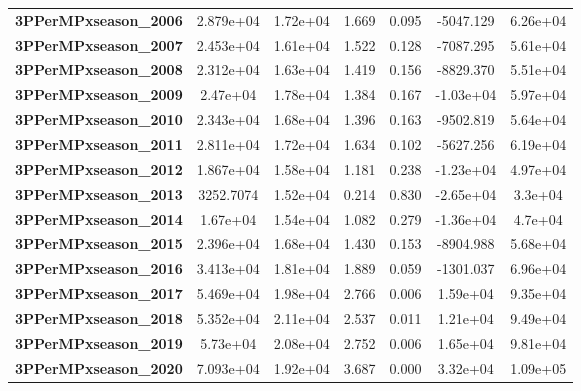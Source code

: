 \begin{center}
\begin{tabular}{lcccccc}
\textbf{3PPerMPxseason\_2006} &    2.879e+04  &     1.72e+04     &     1.669  &         0.095        &    -5047.129    &     6.26e+04     \\
\textbf{3PPerMPxseason\_2007} &    2.453e+04  &     1.61e+04     &     1.522  &         0.128        &    -7087.295    &     5.61e+04     \\
\textbf{3PPerMPxseason\_2008} &    2.312e+04  &     1.63e+04     &     1.419  &         0.156        &    -8829.370    &     5.51e+04     \\
\textbf{3PPerMPxseason\_2009} &     2.47e+04  &     1.78e+04     &     1.384  &         0.167        &    -1.03e+04    &     5.97e+04     \\
\textbf{3PPerMPxseason\_2010} &    2.343e+04  &     1.68e+04     &     1.396  &         0.163        &    -9502.819    &     5.64e+04     \\
\textbf{3PPerMPxseason\_2011} &    2.811e+04  &     1.72e+04     &     1.634  &         0.102        &    -5627.256    &     6.19e+04     \\
\textbf{3PPerMPxseason\_2012} &    1.867e+04  &     1.58e+04     &     1.181  &         0.238        &    -1.23e+04    &     4.97e+04     \\
\textbf{3PPerMPxseason\_2013} &    3252.7074  &     1.52e+04     &     0.214  &         0.830        &    -2.65e+04    &      3.3e+04     \\
\textbf{3PPerMPxseason\_2014} &     1.67e+04  &     1.54e+04     &     1.082  &         0.279        &    -1.36e+04    &      4.7e+04     \\
\textbf{3PPerMPxseason\_2015} &    2.396e+04  &     1.68e+04     &     1.430  &         0.153        &    -8904.988    &     5.68e+04     \\
\textbf{3PPerMPxseason\_2016} &    3.413e+04  &     1.81e+04     &     1.889  &         0.059        &    -1301.037    &     6.96e+04     \\
\textbf{3PPerMPxseason\_2017} &    5.469e+04  &     1.98e+04     &     2.766  &         0.006        &     1.59e+04    &     9.35e+04     \\
\textbf{3PPerMPxseason\_2018} &    5.352e+04  &     2.11e+04     &     2.537  &         0.011        &     1.21e+04    &     9.49e+04     \\
\textbf{3PPerMPxseason\_2019} &     5.73e+04  &     2.08e+04     &     2.752  &         0.006        &     1.65e+04    &     9.81e+04     \\
\textbf{3PPerMPxseason\_2020} &    7.093e+04  &     1.92e+04     &     3.687  &         0.000        &     3.32e+04    &     1.09e+05     \\

\end{tabular}
\end{center}
